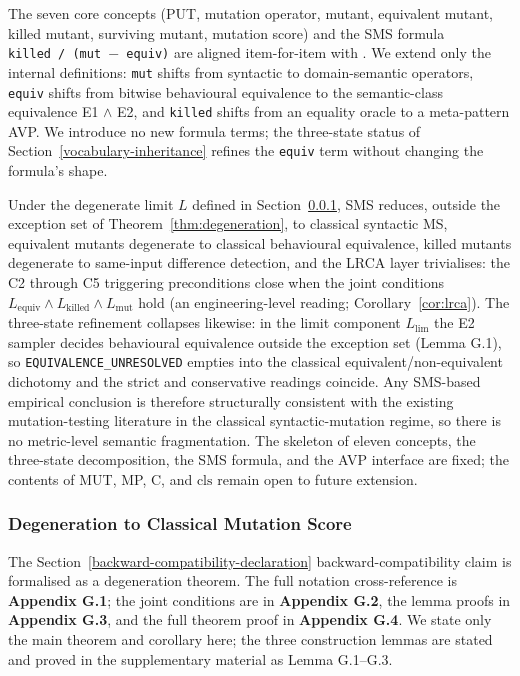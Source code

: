 \documentclass[manuscript,screen,review]{acmart}
\begin{document}
The seven core concepts (PUT, mutation operator, mutant, equivalent
mutant, killed mutant, surviving mutant, mutation score) and the SMS
formula
\texttt{\textbar{}killed\textbar{}\ /\ (\textbar{}mut\textbar{}\ $-$\ \textbar{}equiv\textbar{})}
are aligned item-for-item with \citet{d7c38286734419b52de4262c9802ebdfcf4b9447}. We extend only the
internal definitions: \texttt{mut} shifts from syntactic to
domain-semantic operators, \texttt{equiv} shifts from bitwise
behavioural equivalence to the semantic-class equivalence E1 $\wedge$ E2, and
\texttt{killed} shifts from an equality oracle to a meta-pattern AVP. We
introduce no new formula terms; the three-state status of
Section~\ref{vocabulary-inheritance} refines the \texttt{equiv} term
without changing the formula's shape.

Under the degenerate limit $L$ defined in Section~\ref{sms-ms-degeneration-formal-statement}, SMS reduces,
outside the exception set of Theorem~\ref{thm:degeneration},
to classical syntactic MS, equivalent mutants
degenerate to classical behavioural equivalence, killed mutants
degenerate to same-input difference detection, and the LRCA layer
trivialises: the C2 through C5 triggering preconditions close when the
joint conditions
$L_{\mathrm{equiv}} \wedge L_{\mathrm{killed}} \wedge L_{\mathrm{mut}}$
hold (an engineering-level reading; Corollary~\ref{cor:lrca}). The
three-state refinement collapses likewise: in the limit component
$L_{\mathrm{lim}}$ the E2 sampler decides behavioural equivalence
outside the exception set (Lemma G.1), so
\texttt{EQUIVALENCE\_UNRESOLVED} empties into the classical
equivalent/non-equivalent dichotomy and the strict and conservative
readings coincide. Any
SMS-based empirical conclusion is therefore structurally consistent with
the existing mutation-testing literature in the classical
syntactic-mutation regime, so there is no metric-level semantic
fragmentation. The skeleton of eleven concepts, the three-state
decomposition, the SMS formula, and the AVP interface are fixed; the
contents of MUT, MP, C, and $\mathrm{cls}$ remain open to future
extension.

\subsubsection{Degeneration to Classical Mutation Score}\label{sms-ms-degeneration-formal-statement}

The Section~\ref{backward-compatibility-declaration} backward-compatibility claim is formalised as a degeneration
theorem. The full notation cross-reference is \textbf{Appendix G.1}; the joint
conditions are in \textbf{Appendix G.2}, the lemma proofs in
\textbf{Appendix G.3}, and the full theorem proof in \textbf{Appendix G.4}. We
state only the main theorem and corollary here; the three construction
lemmas are stated and proved in the supplementary material as
Lemma G.1--G.3.
\end{document}
